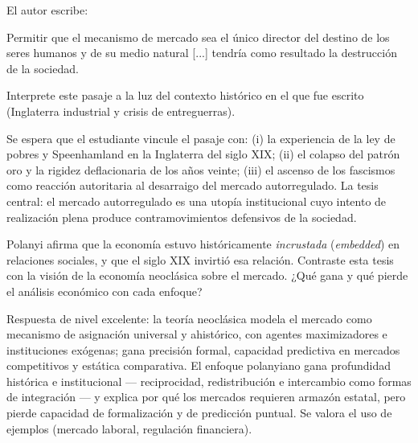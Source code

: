 \documentclass{evaluacion}
\begin{document}
\begin{pregunta}
El autor escribe:
\begin{displayquote}
  Permitir que el mecanismo de mercado sea el único director del destino
  de los seres humanos y de su medio natural [...] tendría como resultado
  la destrucción de la sociedad.
\end{displayquote}
Interprete este pasaje a la luz del contexto histórico en el que fue
escrito (Inglaterra industrial y crisis de entreguerras).
\begin{solucion}
Se espera que el estudiante vincule el pasaje con: (i) la experiencia de
la ley de pobres y Speenhamland en la Inglaterra del siglo XIX;
(ii) el colapso del patrón oro y la rigidez deflacionaria de los años
veinte; (iii) el ascenso de los fascismos como reacción autoritaria al
desarraigo del mercado autorregulado. La tesis central: el mercado
autorregulado es una utopía institucional cuyo intento de realización
plena produce contramovimientos defensivos de la sociedad.
\end{solucion}
\end{pregunta}

\begin{pregunta}
Polanyi afirma que la economía estuvo históricamente \emph{incrustada}
(\emph{embedded}) en relaciones sociales, y que el siglo XIX invirtió esa
relación. Contraste esta tesis con la visión de la economía neoclásica
sobre el mercado. ¿Qué gana y qué pierde el análisis económico con cada
enfoque?
\begin{solucion}
Respuesta de nivel excelente: la teoría neoclásica modela el mercado como
mecanismo de asignación universal y ahistórico, con agentes maximizadores
e instituciones exógenas; gana precisión formal, capacidad predictiva en
mercados competitivos y estática comparativa. El enfoque polanyiano gana
profundidad histórica e institucional — reciprocidad, redistribución e
intercambio como formas de integración — y explica por qué los mercados
requieren armazón estatal, pero pierde capacidad de formalización y de
predicción puntual. Se valora el uso de ejemplos (mercado laboral,
regulación financiera).
\end{solucion}
\end{pregunta}
\end{document}
